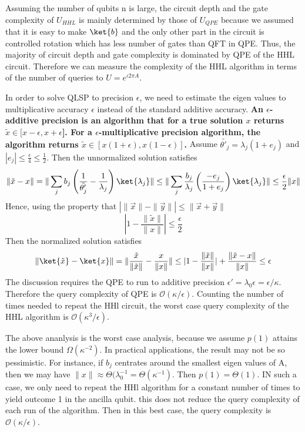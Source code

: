 \documentclass[12pt, oneside]{book}
\theoremstyle{definition}
\theoremstyle{definition}
\theoremstyle{remark}
\begin{document}
Assuming the number of qubits n is large, the circuit depth and the gate complexity of $U_{HHL}$ is mainly determined by those of $U_{QPE}$ because we assumed that it is easy to make $\ket{b}$ and the only other part in the circuit is controlled rotation which has less number of gates than QFT in QPE. Thus, the majority of circuit depth and gate complexity is dominated by QPE of the HHL circuit.
Therefore we can measure the complexity of the HHL algorithm in terms of the number of queries to $U=e^{\iota 2\pi A}$. 

In order to solve QLSP to precision $\epsilon$, we need to estimate the eigen values to multiplicative accuracy $\epsilon$ instead of the standard additive accuracy. \textbf{An $\epsilon$-additive precision is an algorithm that for a true solution $x$ returns $\tilde{x} \in [x-\epsilon,x+\epsilon$]. For a $\epsilon$-multiplicative precision algorithm, the algorithm returns $\tilde{x} \in [x(1+\epsilon),x(1-\epsilon)]$.} Assume $\tilde{\theta'_j}=\lambda_j(1+e_j)$ and $|e_j|\leq \frac{\epsilon}{4} \leq \frac{1}{2}$. Then the unnormalized solution satisfies
\[
\|\tilde{x}-x\|=\|\sum_j b_j\left(\frac{1}{\tilde{\theta'_j}}-\frac{1}{\lambda_j}\right)\ket{\lambda_j}\|\leq \|\sum_j\frac{b_j}{\lambda_j}\left(\frac{-e_j}{1+e_j}\right)\ket{\lambda_j}\|\leq \frac{\epsilon}{2}\|x\|
\]
Hence, using the property that $|\|\vec{x}\|-\|\vec{y}\||\leq \|\vec{x}+\vec{y}\|$
\[
|1-\frac{\|\tilde{x}\|}{\|x\|}|\leq \frac{\epsilon}{2}
\]
Then the normalized solution satisfies
\[
\|\ket{\tilde{x}}-\ket{x}\|=\|\frac{\tilde{x}}{\|\tilde{x}\|}-\frac{x}{\|x\|}\|\leq |1-\frac{\|\tilde{x}\|}{\|x\|}|+\frac{\|\tilde{x}-x\|}{\|x\|}\leq \epsilon
\]
The discussion requires the QPE to run to additive precision $\epsilon'=\lambda_0\epsilon=\epsilon/\kappa$. Therefore the query complexity of QPE is $\mathcal{O}(\kappa/\epsilon)$. Counting the number of times needed to repeat the HHl circuit, the worst case query complexity of the HHL algorithm is $\mathcal{O}(\kappa^3/\epsilon)$.

The above ananlysis is the worst case analysis, because we assume $p(1)$ attains the lower bound $\Omega(\kappa^{-2})$. In practical applications, the result may not be so pessimistic. For instance, if $b_j$ centrates around the smallest eigen values of A, then we may have $\|x\|\approx \Theta(\lambda^{-1}_0=\Theta(\kappa^{-1})$. Then $p(1)=\Theta(1)$. IN such a case, we only need to repeat the HHl algorithm for a constant number of times to yield outcome 1 in the ancilla qubit. this does not reduce the query complexity of each run of the algorithm. Then in this best case, the query complexity is $\mathcal{O}(\kappa/\epsilon)$.
\end{document}

